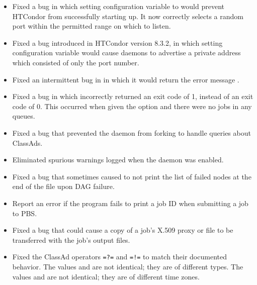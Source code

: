 \begin{itemize}
\item Fixed a bug in which setting configuration variable
 to 
would prevent HTCondor from successfully starting up.  
It now correctly
selects a random port within the permitted range on which to listen.

\item Fixed a bug introduced in HTCondor version 8.3.2,
in which setting configuration variable
 would cause daemons to advertise a private
address which consisted of only the port number.

\item Fixed an intermittent bug in   in which it would
return the error message .

\item Fixed a bug in which  incorrectly returned an exit code of 1,
instead of an exit code of 0.
This occurred when given the  option 
and there were no jobs in any queues.

\item Fixed a bug that prevented the  daemon from forking 
to handle queries about  ClassAds.

\item Eliminated spurious warnings logged when the 
daemon was enabled.

\item Fixed a bug that sometimes caused  to not print
the list of failed nodes at the end of the  file upon
DAG failure.

\item Report an error if the  program fails to print a job ID
when submitting a job to PBS. 

\item Fixed a bug that could cause a copy of a job's X.509 proxy
or file  to be transferred with
the job's output files.

\item Fixed the ClassAd operators \verb+=?=+ and \verb+=!=+ to match
their documented behavior.
The values  and  are not identical; 
they are of different types.
The values  and
 are not identical;
they are of different time zones.


\end{itemize}
